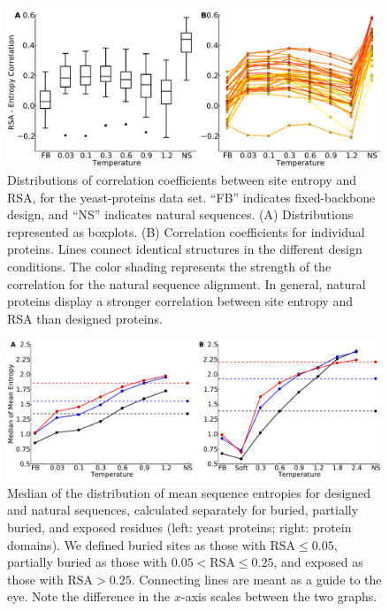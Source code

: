 \documentclass[12pt]{article}
\begin{document}
\begin{figure}[H]
\centerline{\includegraphics[width = 6in]{figures/Cor_Mean_Entropy_RSA_Combination_Plot.pdf}}
\caption{Distributions of correlation coefficients between site entropy and RSA, for the yeast-proteins data set. ``FB'' indicates fixed-backbone design, and ``NS'' indicates natural sequences. (A) Distributions represented as boxplots. (B) Correlation coefficients for individual proteins. Lines connect identical structures in the different design conditions. The color shading represents the strength of the correlation for the natural sequence alignment. In general, natural proteins display a stronger correlation between site entropy and RSA than designed proteins.}
\label{Correlation_figure}
\end{figure}


\begin{figure}[H]
\centerline{\includegraphics[width = 6in]{figures/Mean_Entropy_Position_Lineplot_Combo.pdf}}
\caption{Median of the distribution of mean sequence entropies for designed and natural sequences, calculated separately for buried, partially buried, and exposed residues (left: yeast proteins; right: protein domains). We defined buried sites as those with $\text{RSA}\leq 0.05$, partially buried as those with $0.05<\text{RSA}\leq0.25$, and exposed as those with $\text{RSA}>0.25$. Connecting lines are meant as a guide to the eye. Note the difference in the $x$-axis scales between the two graphs.}
\label{Mean_Entropy_Surface_Core}
\end{figure}
\end{document}

